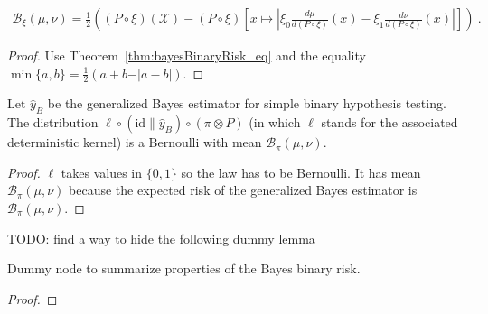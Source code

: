\begin{corollary}
  \label{cor:bayesBinaryRisk_eq_abs}
  \leanok
  \begin{align*}
  \mathcal B_\xi(\mu, \nu) = \frac{1}{2}\left((P \circ \xi)(\mathcal X) -  (P \circ \xi)\left[x \mapsto \left\vert \xi_0\frac{d \mu}{d(P \circ \xi)}(x) - \xi_1\frac{d \nu}{d(P \circ \xi)}(x)\right\vert\right] \right)
  \: .
  \end{align*}
\end{corollary}

\begin{proof}\leanok
{}
Use Theorem~\ref{thm:bayesBinaryRisk_eq} and the equality $\min\{a,b\} = \frac{1}{2}(a + b - \vert a - b \vert)$.
\end{proof}


\begin{lemma}
  \label{lem:bayesBinaryRisk_bernoulli}
  Let $\hat{y}_B$ be the generalized Bayes estimator for simple binary hypothesis testing.
  The distribution $\ell \circ (\mathrm{id} \parallel \hat{y}_B) \circ (\pi \otimes P)$ (in which $\ell$ stands for the associated deterministic kernel) is a Bernoulli with mean $\mathcal B_\pi(\mu, \nu)$.
\end{lemma}

\begin{proof}%
{}
$\ell$ takes values in $\{0,1\}$ so the law has to be Bernoulli. It has mean $\mathcal B_\pi(\mu, \nu)$ because the expected risk of the generalized Bayes estimator is $\mathcal B_\pi(\mu, \nu)$.
\end{proof}



TODO: find a way to hide the following dummy lemma
\begin{lemma}
  \label{lem:bayesBinaryRisk_properties}
  \leanok
  Dummy node to summarize properties of the Bayes binary risk.
\end{lemma}

\begin{proof}\leanok
{}
\end{proof}


